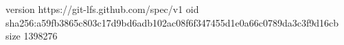 version https://git-lfs.github.com/spec/v1
oid sha256:a59fb3865c803c17d9bd6adb102ac08f6f347455d1e0a66c0789da3c3f9d16cb
size 1398276
